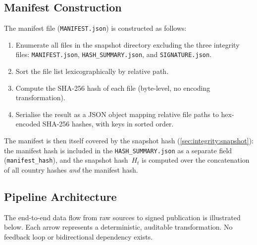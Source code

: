 \subsection{Manifest Construction}\label{sec:snapshot:manifest}

The manifest file (\texttt{MANIFEST.json}) is constructed as follows:

\begin{enumerate}
  \item Enumerate all files in the snapshot directory excluding
    the three integrity files:
    \texttt{MANIFEST.json},
    \texttt{HASH\_SUMMARY.json}, and
    \texttt{SIGNATURE.json}.
  \item Sort the file list lexicographically by relative path.
  \item Compute the SHA-256 hash of each file (byte-level, no encoding
    transformation).
  \item Serialise the result as a JSON object mapping relative file paths
    to hex-encoded SHA-256 hashes, with keys in sorted order.
\end{enumerate}

The manifest is then itself covered by the snapshot hash
(\cref{sec:integrity:snapshot}): the manifest hash is included in the
\texttt{HASH\_SUMMARY.json} as a separate field
(\texttt{manifest\_hash}), and the snapshot hash~\(H_t\) is computed
over the concatenation of all country hashes \emph{and} the manifest hash.

\subsection{Pipeline Architecture}\label{sec:snapshot:pipeline}

The end-to-end data flow from raw sources to signed publication is
illustrated below.  Each arrow represents a deterministic, auditable
transformation.  No feedback loop or bidirectional dependency exists.

